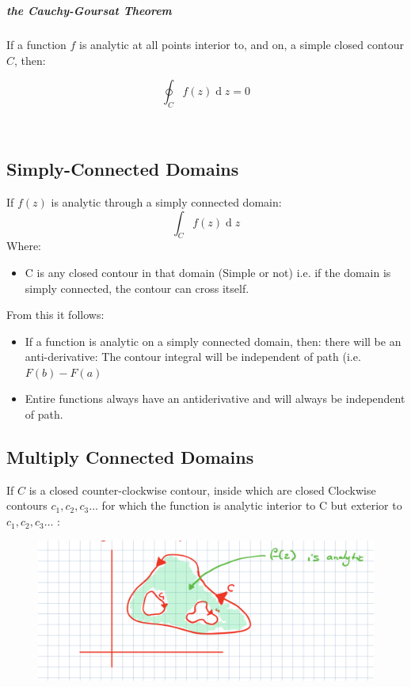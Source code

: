 \documentclass[class=article, crop=false]{standalone}
\begin{document}
\ \

\hfill\begin{minipage}{\dimexpr\textwidth-3cm}
\begin{tcolorbox}

  \subparagraph{ the \textit{Cauchy-Goursat Theorem}} 

  If a function $f$ is analytic at all points interior to, and on, a simple closed contour $C$, then:

  \[
  \oint^{}_{C} f\left( z \right)   \operatorname{d}z = 0 
  \]
\end{tcolorbox}

\end{minipage}
\ \

\subsection{Simply-Connected Domains}
If $f\left( z \right) $ is analytic through a simply connected domain:
\[
\int^{}_{C} f\left( z \right)   \operatorname{d}z 
\]
Where:
\begin{itemize}
  \item C is any closed contour in that domain (Simple or not)
    \subitem i.e. if the domain is simply connected, the contour can cross itself.
\end{itemize}

From this it follows:
\begin{itemize}
  \item If a function is analytic on a simply connected domain, then:
    \subitem there will be an anti-derivative:
    \subsubitem The contour integral will be independent of path (i.e.$F(b) - F(a)$ 
    \item Entire functions always have an antiderivative
      \subitem and will always be independent of path.
\end{itemize}

\subsection{Multiply Connected Domains}
If $C$ is a closed counter-clockwise contour, inside which are closed Clockwise contours $c_1, c_2, c_3 \dots$ for which the function is analytic interior to C but exterior to $c_1, c_2, c_3 \dots$ :


\begin{figure}[h!]
	\centering
	\includegraphics[width=0.7\linewidth]{./media/CompexIntegrals/s1.png}
	\caption{}
	\label{fig:s1}
\end{figure}
\end{document}
